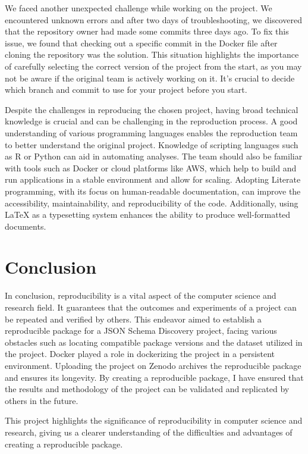 \documentclass[sigconf]{acmart}
\begin{document}
We faced another unexpected challenge while working on the project. We encountered unknown errors and after two days of troubleshooting, we discovered that the repository owner had made some commits three days ago. To fix this issue, we found that checking out a specific commit in the Docker file after cloning the repository was the solution. This situation highlights the importance of carefully selecting the correct version of the project from the start, as you may not be aware if the original team is actively working on it. It's crucial to decide which branch and commit to use for your project before you start.

Despite the challenges in reproducing the chosen project, having broad technical knowledge is crucial and can be challenging in the reproduction process. A good understanding of various programming languages enables the reproduction team to better understand the original project. Knowledge of scripting languages such as R or Python can aid in automating analyses. The team should also be familiar with tools such as Docker or cloud platforms like AWS, which help to build and run applications in a stable environment and allow for scaling. Adopting Literate programming, with its focus on human-readable documentation, can improve the accessibility, maintainability, and reproducibility of the code. Additionally, using LaTeX as a typesetting system enhances the ability to produce well-formatted documents.

\section{Conclusion}

In conclusion, reproducibility is a vital aspect of the computer science and research field. It guarantees that the outcomes and experiments of a project can be repeated and verified by others. This endeavor aimed to establish a reproducible package for a JSON Schema Discovery project, facing various obstacles such as locating compatible package versions and the dataset utilized in the project.
Docker played a role in dockerizing the project in a persistent environment. Uploading the project on Zenodo archives the reproducible package and ensures its longevity.
By creating a reproducible package, I have ensured that the results and methodology of the project can be validated and replicated by others in the future.

This project highlights the significance of reproducibility in computer science and research, giving us a clearer understanding of the difficulties and advantages of creating a reproducible package.




\appendix
\end{document}
